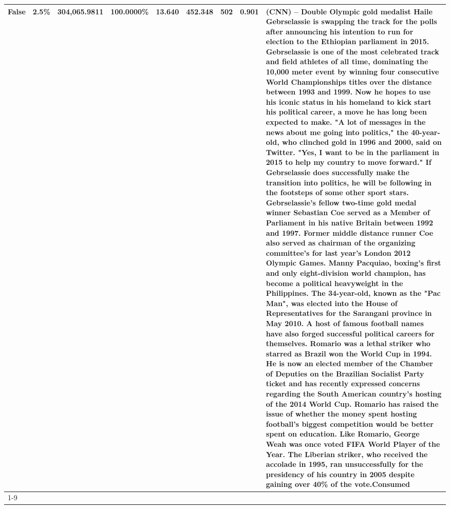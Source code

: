 \begin{table}[H]
{\begin{tabular}{lllrlllll}
False & 2.5\% & 304,065.9811 & \bfseries \color{red} 100.0000\% & 13.640 & 452.348 & 502 & 0.901 & (CNN) -- Double Olympic gold medalist Haile Gebrselassie is swapping the track for the polls after announcing his intention to run for election to the Ethiopian parliament in 2015. Gebrselassie is one of the most celebrated track and field athletes of all time, dominating the 10,000 meter event by winning four consecutive World Championships titles over the distance between 1993 and 1999. Now he hopes to use his iconic status in his homeland to kick start his political career, a move he has long been expected to make. "A lot of messages in the news about me going into politics," the 40-year-old, who clinched gold in 1996 and 2000, said on Twitter. "Yes, I want to be in the parliament in 2015 to help my country to move forward." If Gebrselassie does successfully make the transition into politics, he will be following in the footsteps of some other sport stars. Gebrselassie's fellow two-time gold medal winner Sebastian Coe served as a Member of Parliament in his native Britain between 1992 and 1997. Former middle distance runner Coe also served as chairman of the organizing committee's for last year's London 2012 Olympic Games. Manny Pacquiao, boxing's first and only eight-division world champion, has become a political heavyweight in the Philippines. The 34-year-old, known as the "Pac Man", was elected into the House of Representatives for the Sarangani province in May 2010. A host of famous football names have also forged successful political careers for themselves. Romario was a lethal striker who starred as Brazil won the World Cup in 1994. He is now an elected member of the Chamber of Deputies on the Brazilian Socialist Party ticket and has recently expressed concerns regarding the South American country's hosting of the 2014 World Cup. Romario has raised the issue of whether the money spent hosting football's biggest competition would be better spent on education. Like Romario, George Weah was once voted FIFA World Player of the Year. The Liberian striker, who received the accolade in 1995, ran unsuccessfully for the presidency of his country in 2005 despite gaining over 40\% of the vote.Consumed \\
\cline{1-9}

\end{tabular}}
\end{table}
